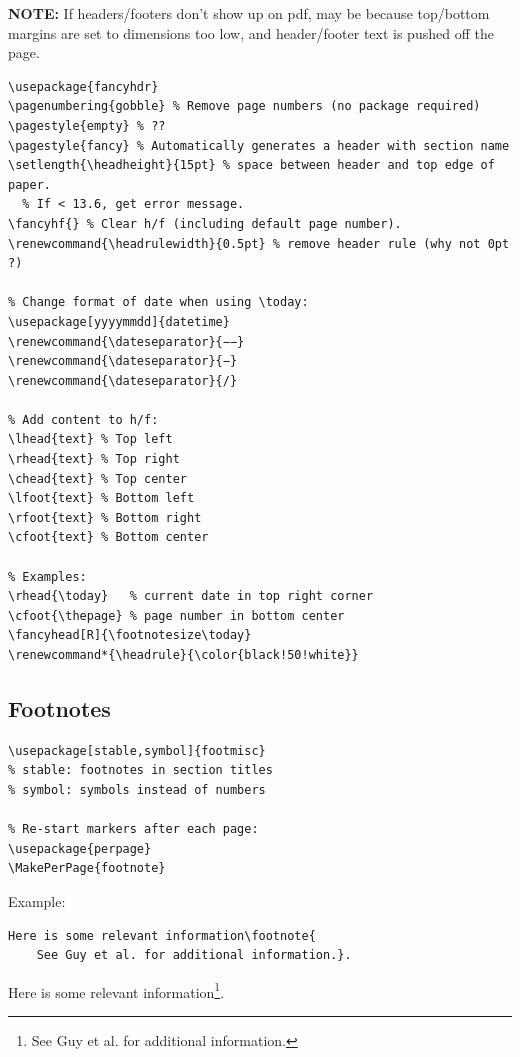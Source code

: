 \documentclass{article}
\begin{document}
\textbf{NOTE:} If headers/footers don't show up on pdf,
may be because top/bottom margins are set to dimensions too low,
and header/footer text is pushed off the page.

\begin{minipage}{0.5\textwidth}
\begin{lstlisting}
\usepackage{fancyhdr}
\pagenumbering{gobble} % Remove page numbers (no package required)
\pagestyle{empty} % ??
\pagestyle{fancy} % Automatically generates a header with section name
\setlength{\headheight}{15pt} % space between header and top edge of paper.
  % If < 13.6, get error message.
\fancyhf{} % Clear h/f (including default page number).
\renewcommand{\headrulewidth}{0.5pt} % remove header rule (why not 0pt ?)

% Change format of date when using \today:
\usepackage[yyyymmdd]{datetime}
\renewcommand{\dateseparator}{−−}
\renewcommand{\dateseparator}{−}
\renewcommand{\dateseparator}{/}

% Add content to h/f:
\lhead{text} % Top left
\rhead{text} % Top right
\chead{text} % Top center
\lfoot{text} % Bottom left
\rfoot{text} % Bottom right
\cfoot{text} % Bottom center

% Examples:
\rhead{\today}   % current date in top right corner
\cfoot{\thepage} % page number in bottom center
\fancyhead[R]{\footnotesize\today}
\renewcommand*{\headrule}{\color{black!50!white}}
\end{lstlisting}
\end{minipage}%




\subsection{Footnotes}
\begin{minipage}[t]{0.5\textwidth}
\begin{lstlisting}
\usepackage[stable,symbol]{footmisc}
% stable: footnotes in section titles
% symbol: symbols instead of numbers

% Re-start markers after each page:
\usepackage{perpage}
\MakePerPage{footnote}
\end{lstlisting}
\end{minipage}%
\begin{minipage}[t]{0.5\textwidth}
    Example:
\begin{lstlisting}
Here is some relevant information\footnote{
    See Guy et al. for additional information.}.
\end{lstlisting}

Here is some relevant information\footnote{
    See Guy et al. for additional information.}.
\end{minipage}
\end{document}
